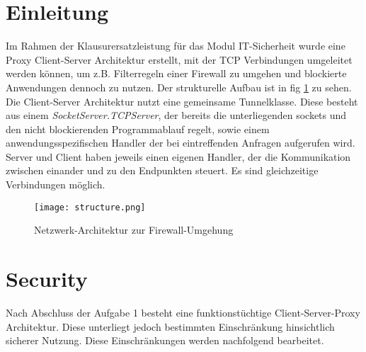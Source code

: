 \documentclass[12pt, a4paper]{scrartcl}
\begin{document}


\tableofcontents
\newpage
{}
\setcounter{lastroman}{\value{page}}

\pagestyle{plain}
\maketitle

\section{Einleitung}
Im Rahmen der Klausurersatzleistung für das Modul IT-Sicherheit wurde eine Proxy Client-Server Architektur erstellt, mit der TCP Verbindungen umgeleitet werden können, um z.B. Filterregeln einer Firewall zu umgehen und blockierte Anwendungen dennoch zu nutzen. Der strukturelle Aufbau ist in fig \ref{fig::arch} zu sehen.\newline
Die Client-Server Architektur nutzt eine gemeinsame Tunnelklasse. Diese besteht aus einem \textit{SocketServer.TCPServer}, der bereits die unterliegenden sockets und den nicht blockierenden Programmablauf regelt, sowie einem anwendungsspezifischen Handler der bei eintreffenden Anfragen aufgerufen wird. Server und Client haben jeweils einen eigenen Handler, der die Kommunikation zwischen einander und zu den Endpunkten steuert. Es sind gleichzeitige Verbindungen möglich.

\begin{figure}[H]
    \centering
    \texttt{[image: structure.png]}
    \caption{Netzwerk-Architektur zur Firewall-Umgehung}
    \label{fig::arch}
\end{figure}

\section{Security}
Nach Abschluss der Aufgabe 1 besteht eine funktionstüchtige Client-Server-Proxy Architektur. Diese unterliegt jedoch bestimmten Einschränkung hinsichtlich sicherer Nutzung. Diese Einschränkungen werden nachfolgend bearbeitet.
\end{document}
